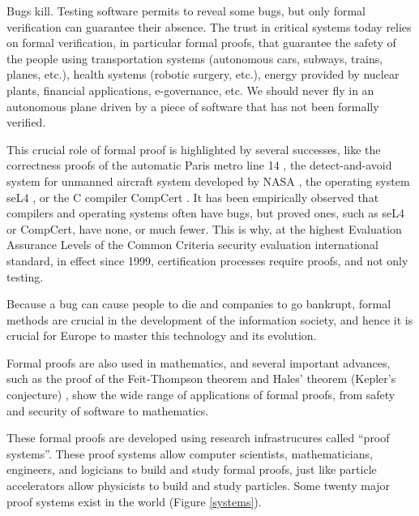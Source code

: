 \thispagestyle{empty}

Bugs kill.  Testing software permits to reveal some bugs, but only
formal verification can guarantee their absence.  The trust in
critical systems today relies on formal verification, in particular
formal proofs, that guarantee the safety of the people using
transportation systems (autonomous cars, subways, trains, planes,
etc.), health systems (robotic surgery, etc.), energy provided by
nuclear plants, financial applications, e-governance, etc.  We should
never fly in an autonomous plane driven by a piece of software that
has not been formally verified.

This crucial role of formal proof is highlighted by several successes,
like the correctness proofs of the automatic Paris metro line 14
\cite{metro14}, the detect-and-avoid system for unmanned aircraft
system developed by NASA \cite{Munoz16}, the operating system seL4
\cite{Klein09}, or the C compiler CompCert \cite{Leroy06}.  It has
been empirically observed that compilers and operating systems often
have bugs, but proved ones, such as seL4 or CompCert, have none, or
much fewer.  This is why, at the highest Evaluation Assurance Levels
of the Common Criteria security evaluation international standard, in
effect since 1999, certification processes require proofs, and not
only testing.

Because a bug can cause people to die and companies to go bankrupt,
formal methods are crucial in the development of the information
society, and hence it is crucial for Europe to master this technology
and its evolution.

Formal proofs are also used in mathematics, and several important
advances, such as the proof of the Feit-Thompson theorem
\cite{Gonthier13} and Hales' theorem (Kepler's conjecture)
\cite{Hales17}, show the wide range of applications of formal proofs,
from safety and security of software to mathematics.

These formal proofs are developed using research infrastrucures called
``proof systems''.  These proof systems allow computer scientists,
mathematicians, engineers, and logicians to build and study formal
proofs, just like particle accelerators allow physicists to build and
study particles.  Some twenty major proof systems exist in the world
(Figure \ref{systems}).

\begin{center}
  
\bigstar \bigstar \bigstar

\end{center}

